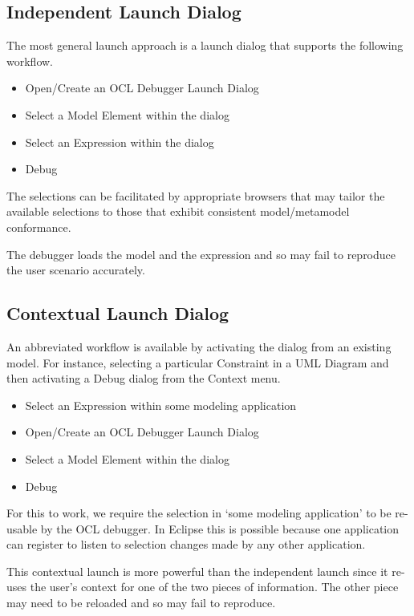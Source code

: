 \documentclass[a4paper]{article}
\begin{document}
\subsection{Independent Launch Dialog}\label{IndependentLaunch}

The most general launch approach is a launch dialog that supports the following workflow.

\begin{itemize}
\item Open/Create an OCL Debugger Launch Dialog
\item Select a Model Element within the dialog
\item Select an Expression within the dialog
\item Debug
\end{itemize}

The selections can be facilitated by appropriate browsers that may tailor the available selections to those that exhibit consistent model/metamodel conformance.

The debugger loads the model and the expression and so may fail to reproduce the user scenario accurately.

\subsection{Contextual Launch Dialog}\label{ContextualLaunch}

An abbreviated workflow is available by activating the dialog from an existing model. For instance, selecting a particular Constraint in a UML Diagram and then activating a Debug dialog from the Context menu.

\begin{itemize}
\item Select an Expression within some modeling application
\item Open/Create an OCL Debugger Launch Dialog
\item Select a Model Element within the dialog
\item Debug
\end{itemize}

For this to work, we require the selection in `some modeling application' to be re-usable by the OCL debugger. In Eclipse this is possible because one application can register to listen to selection changes made by any other application.

This contextual launch is more powerful than the independent launch since it re-uses the user's context for one of the two pieces of information. The other piece may need to be reloaded and so may fail to reproduce.
\end{document}
